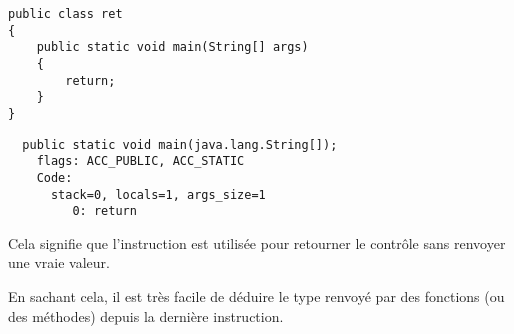 \begin{lstlisting}[style=customjava]
public class ret
{
	public static void main(String[] args) 
	{
		return;
	}
}
\end{lstlisting}

\begin{lstlisting}
  public static void main(java.lang.String[]);
    flags: ACC_PUBLIC, ACC_STATIC
    Code:
      stack=0, locals=1, args_size=1
         0: return        
\end{lstlisting}

Cela signifie que l'instruction  est utilisée pour retourner le contrôle sans renvoyer
une vraie valeur.

En sachant cela, il est très facile de déduire le type renvoyé par des fonctions (ou des méthodes) depuis la dernière instruction.

